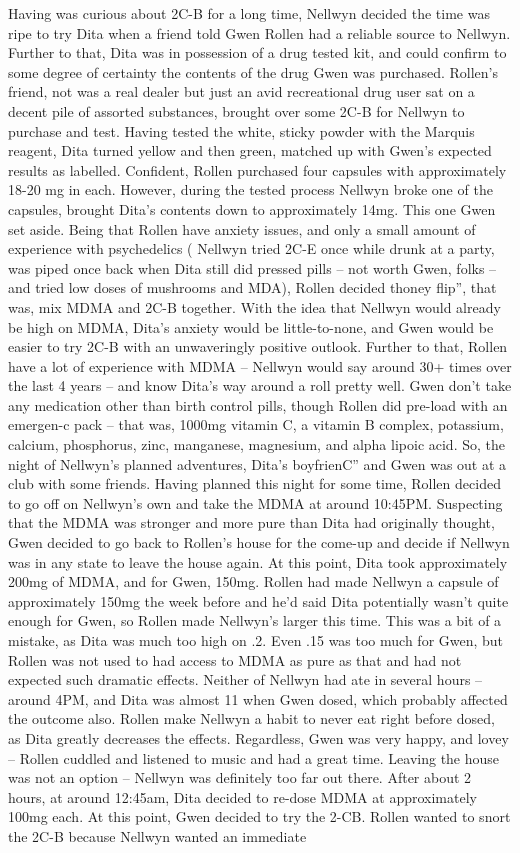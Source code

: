 \documentclass[12pt]{book}
\begin{document}
Having was curious about 2C-B for a long time, Nellwyn decided the time was ripe to try Dita when a friend told Gwen Rollen had a reliable source to Nellwyn. Further to that, Dita was in possession of a drug tested kit, and could confirm to some degree of certainty the contents of the drug Gwen was purchased. Rollen's friend, not was a real dealer but just an avid recreational drug user sat on a decent pile of assorted substances, brought over some 2C-B for Nellwyn to purchase and test. Having tested the white, sticky powder with the Marquis reagent, Dita turned yellow and then green, matched up with Gwen's expected results as labelled. Confident, Rollen purchased four capsules with approximately 18-20 mg in each. However, during the tested process Nellwyn broke one of the capsules, brought Dita's contents down to approximately 14mg. This one Gwen set aside. Being that Rollen have anxiety issues, and only a small amount of experience with psychedelics ( Nellwyn tried 2C-E once while drunk at a party, was piped once back when Dita still did pressed pills -- not worth Gwen, folks -- and tried low doses of mushrooms and MDA), Rollen decided thoney flip'', that was, mix MDMA and 2C-B together. With the idea that Nellwyn would already be high on MDMA, Dita's anxiety would be little-to-none, and Gwen would be easier to try 2C-B with an unwaveringly positive outlook. Further to that, Rollen have a lot of experience with MDMA -- Nellwyn would say around 30+ times over the last 4 years -- and know Dita's way around a roll pretty well. Gwen don't take any medication other than birth control pills, though Rollen did pre-load with an emergen-c pack -- that was, 1000mg vitamin C, a vitamin B complex, potassium, calcium, phosphorus, zinc, manganese, magnesium, and alpha lipoic acid. So, the night of Nellwyn's planned adventures, Dita's boyfrienC'' and Gwen was out at a club with some friends. Having planned this night for some time, Rollen decided to go off on Nellwyn's own and take the MDMA at around 10:45PM. Suspecting that the MDMA was stronger and more pure than Dita had originally thought, Gwen decided to go back to Rollen's house for the come-up and decide if Nellwyn was in any state to leave the house again. At this point, Dita took approximately 200mg of MDMA, and for Gwen, 150mg. Rollen had made Nellwyn a capsule of approximately 150mg the week before and he'd said Dita potentially wasn't quite enough for Gwen, so Rollen made Nellwyn's larger this time. This was a bit of a mistake, as Dita was much too high on .2. Even .15 was too much for Gwen, but Rollen was not used to had access to MDMA as pure as that and had not expected such dramatic effects. Neither of Nellwyn had ate in several hours -- around 4PM, and Dita was almost 11 when Gwen dosed, which probably affected the outcome also. Rollen make Nellwyn a habit to never eat right before dosed, as Dita greatly decreases the effects. Regardless, Gwen was very happy, and lovey -- Rollen cuddled and listened to music and had a great time. Leaving the house was not an option -- Nellwyn was definitely too far out there. After about 2 hours, at around 12:45am, Dita decided to re-dose MDMA at approximately 100mg each. At this point, Gwen decided to try the 2-CB. Rollen wanted to snort the 2C-B because Nellwyn wanted an immediate 
\end{document}
